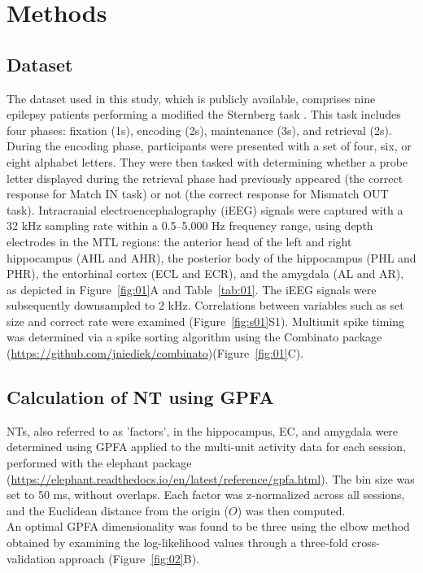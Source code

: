 \section{Methods}
\subsection{Dataset}
The dataset used in this study, which is publicly available, comprises nine epilepsy patients performing a modified the Sternberg task \cite{boran_dataset_2020}. This task includes four phases: fixation (1s), encoding (2s), maintenance (3s), and retrieval (2s). During the encoding phase, participants were presented with a set of four, six, or eight alphabet letters. They were then tasked with determining whether a probe letter displayed during the retrieval phase had previously appeared (the correct response for Match IN task) or not (the correct response for Mismatch OUT task). Intracranial electroencephalography (iEEG) signals were captured with a 32 kHz sampling rate within a 0.5--5,000 Hz frequency range, using depth electrodes in the MTL regions: the anterior head of the left and right hippocampus (AHL and AHR), the posterior body of the hippocampus (PHL and PHR), the entorhinal cortex (ECL and ECR), and the amygdala (AL and AR), as depicted in Figure~\ref{fig:01}A and Table~\ref{tab:01}. The iEEG signals were subsequently downsampled to 2 kHz. Correlations between variables such as set size and correct rate were examined (Figure~\ref{fig:s01}S1). Multiunit spike timing was determined via a spike sorting algorithm \cite{niediek_reliable_2016} using the Combinato package (\url{https://github.com/jniediek/combinato})(Figure~\ref{fig:01}C).

\subsection{Calculation of NT using GPFA}
NTs, also referred to as 'factors', in the hippocampus, EC, and amygdala were determined using GPFA \cite{yu_gaussian-process_2009} applied to the multi-unit activity data for each session, performed with the elephant package (\url{https://elephant.readthedocs.io/en/latest/reference/gpfa.html}). The bin size was set to 50 ms, without overlaps. Each factor was z-normalized across all sessions, and the Euclidean distance from the origin ($O$) was then computed.
\\
\indent
An optimal GPFA dimensionality was found to be three using the elbow method obtained by examining the log-likelihood values through a three-fold cross-validation approach (Figure~\ref{fig:02}B).

